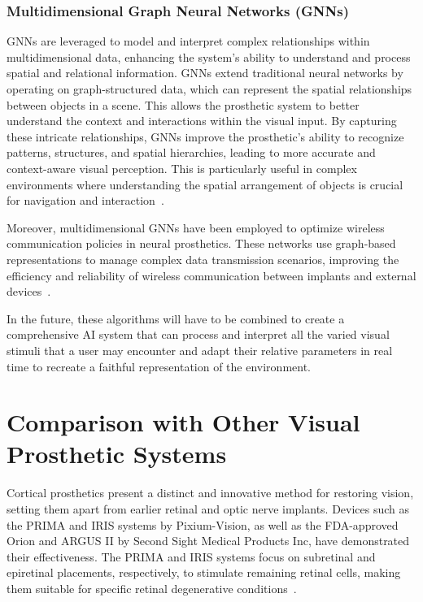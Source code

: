 \documentclass[twocolumn,10pt]{article}
\begin{document}
\subsubsection*{Multidimensional Graph Neural Networks (GNNs)}
GNNs are leveraged to model and interpret complex relationships within
multidimensional data, enhancing the system's ability to understand and process
spatial and relational information. GNNs extend traditional neural networks by
operating on graph-structured data, which can represent the spatial
relationships between objects in a scene. This allows the prosthetic system to
better understand the context and interactions within the visual input. By
capturing these intricate relationships, GNNs improve the prosthetic's ability
to recognize patterns, structures, and spatial hierarchies, leading to more
accurate and context-aware visual perception. This is particularly useful in
complex environments where understanding the spatial arrangement of objects is
crucial for navigation and
interaction~\parencite{subramanianGraphConvolutionalNetworks2020,wuComprehensiveSurveyGraph2021}.

Moreover, multidimensional GNNs have been employed to optimize wireless
communication policies in neural prosthetics. These networks use graph-based
representations to manage complex data transmission scenarios, improving the
efficiency and reliability of wireless communication between implants and
external devices~\parencite{liuMultidimensionalGraphNeural2024}.

In the future, these algorithms will have to be combined to create a
comprehensive AI system that can process and interpret all the varied visual
stimuli that a user may encounter and adapt their relative parameters in real
time to recreate a faithful representation of the environment.

\section*{Comparison with Other Visual Prosthetic Systems}\label{sec:comparison}
Cortical prosthetics present a distinct and innovative method for restoring
vision, setting them apart from earlier retinal and optic nerve implants.
Devices such as the PRIMA and IRIS systems by Pixium-Vision, as well as the
FDA-approved Orion and ARGUS II by Second Sight Medical Products Inc, have
demonstrated their effectiveness. The PRIMA and IRIS systems focus on subretinal
and epiretinal placements, respectively, to stimulate remaining retinal cells,
making them suitable for specific retinal degenerative
conditions~\parencites{muqitProstheticVisualAcuity2023,hoLongTermResultsEpiretinal2015}.
\end{document}
